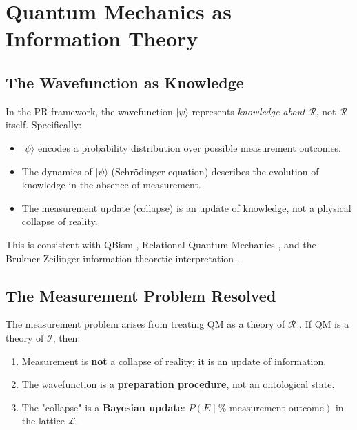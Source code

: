 \documentclass[aps,preprint,showpacs,showkeys]{revtex4}
\begin{document}
\section{Quantum Mechanics as Information Theory}

\subsection{The Wavefunction as Knowledge}

In the PR framework, the wavefunction $|\psi\rangle$ represents \emph{%
knowledge about} $\mathcal{R}$, not $\mathcal{R}$ itself. Specifically:

\begin{itemize}
\item $|\psi\rangle$ encodes a probability distribution over possible
measurement outcomes.

\item The dynamics of $|\psi\rangle$ (Schr\"odinger equation) describes the
evolution of knowledge in the absence of measurement.

\item The measurement update (collapse) is an update of knowledge, not a
physical collapse of reality.
\end{itemize}

This is consistent with QBism \cite{Fuchs2010}, Relational Quantum Mechanics 
\cite{Rovelli1996}, and the Brukner-Zeilinger information-theoretic
interpretation \cite{Brukner2001}.

\subsection{The Measurement Problem Resolved}

The measurement problem arises from treating QM as a theory of $\mathcal{R}$%
. If QM is a theory of $\mathcal{I}$, then:

\begin{enumerate}
\item Measurement is \textbf{not} a collapse of reality; it is an update of
information.

\item The wavefunction is a \textbf{preparation procedure}, not an
ontological state.

\item The "collapse" is a \textbf{Bayesian update}: $P(E \mid \text{%
measurement outcome})$ in the lattice $\mathcal{L}$.
\end{enumerate}
\end{document}
